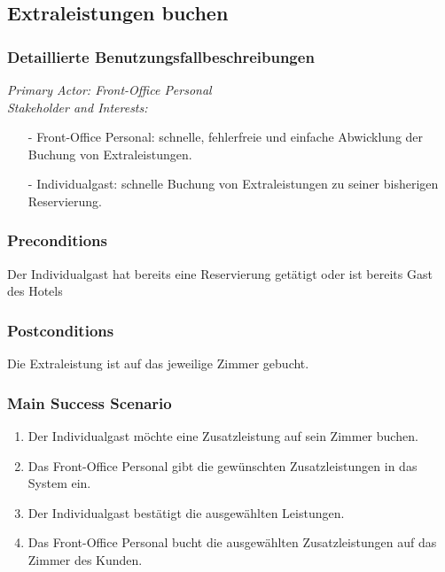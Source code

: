 \documentclass[./detailed_overview_usecases.tex]{subfiles}
\begin{document}
    \subsection{Extraleistungen buchen}
    \subsubsection{Detaillierte Benutzungsfallbeschreibungen}
    \textit{Primary Actor: Front-Office Personal}
    \\
    \textit{Stakeholder and Interests:}
    \begin{itemize}
        \item[-] Front-Office Personal: schnelle, fehlerfreie und einfache Abwicklung der Buchung von Extraleistungen.
        \item[-] Individualgast: schnelle Buchung von Extraleistungen zu seiner bisherigen Reservierung.
    \end{itemize}

    \subsubsection*{Preconditions}
    Der Individualgast hat bereits eine Reservierung getätigt oder ist bereits Gast des Hotels
    \subsubsection*{Postconditions}
    Die Extraleistung ist auf das jeweilige Zimmer gebucht.

    \subsubsection*{Main Success Scenario}
    \begin{enumerate}
        \item Der Individualgast möchte eine Zusatzleistung auf sein Zimmer buchen.
        \item Das Front-Office Personal gibt die gewünschten Zusatzleistungen in das System ein.
        \item Der Individualgast bestätigt die ausgewählten Leistungen.
        \item Das Front-Office Personal bucht die ausgewählten Zusatzleistungen auf das Zimmer des Kunden.
    \end{enumerate}
\end{document}
